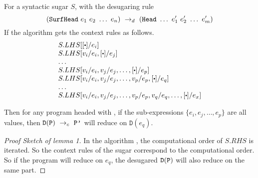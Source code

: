 \begin{lemma}
	For a syntactic sugar $S$, with the desugaring rule
	\[
	(\mbox{\tt SurfHead}~e_1~e_2~\ldots~e_n) ~\rightarrow_d~ (\mbox{\tt Head}~\ldots~e_1'~e_2'~\ldots~e_m')
	\]
	If the algorithm  gets the context rules as follows.\\


	\[
		\begin{array}{l}
			S.LHS[[\bigcdot]/e_i]\\
			S.LHS[v_i/e_i, [\bigcdot]/e_j]\\
			\ldots\\
			S.LHS[v_i/e_i, v_j/e_j, \ldots, [\bigcdot]/e_p]\\
			S.LHS[v_i/e_i, v_j/e_j, \ldots, v_p/e_p, [\bigcdot]/e_q]\\
			\ldots\\
			S.LHS[v_i/e_i, v_j/e_j, \ldots, v_p/e_p, v_q/e_q, \ldots, [\bigcdot]/e_x]\\
		\end{array}
	\]

	



Then for any program  headed with , if the sub-expressions $\{e_i, e_j, \ldots, e_p\}$ are all values, then $\mathtt{D}(\mbox{\tt P}) ~\rightarrow_c~\mbox{\tt P'}$ will reduce on $\mathtt{D}(e_q)$.
\end{lemma}
\begin{proof}[Proof Sketch of lemma 1]
In the algorithm , the computational order of $S.RHS$ is iterated. So the context rules of the sugar correspond to the computational order.
So if the program  will reduce on $e_q$, the desugared $\mathtt{D}(\mbox{\tt P})$ will also reduce on the same part.
\end{proof}

